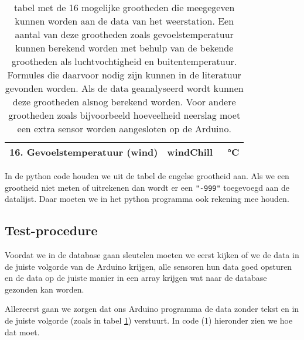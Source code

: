\begin{center}
\begin{table}
\begin{tabular}{ | l | l | l|}
    16. Gevoelstemperatuur (wind) & windChill & \SI{}{\celsius}    \\ \hline
   \end{tabular}
   \caption{tabel met de 16 mogelijke grootheden die meegegeven kunnen worden aan
   de data van het weerstation. Een aantal van deze grootheden zoals gevoelstemperatuur
   kunnen berekend worden met behulp van de bekende grootheden als luchtvochtigheid
   en buitentemperatuur. Formules die daarvoor nodig zijn kunnen in de literatuur gevonden worden.
   Als de data geanalyseerd wordt kunnen deze grootheden alsnog berekend worden.
   Voor andere grootheden zoals bijvoorbeeld hoeveelheid neerslag moet 
   een extra sensor worden aangesloten op de Arduino.}
   \label{table:grootheden}
\end{table}
\end{center}

In de python code houden we uit de tabel de engelse grootheid aan. Als we een grootheid
niet meten of uitrekenen dan wordt er een \verb|"-999"| toegevoegd aan de datalijst.
Daar moeten we in het python programma ook rekening mee houden.

\subsection{Test-procedure} 
Voordat we in de database gaan sleutelen moeten we eerst kijken of we de
data in de juiste volgorde van de Arduino krijgen, alle sensoren hun data goed opsturen
en de data op de juiste manier in een array krijgen wat naar de \hisparc database 
gezonden kan worden.

Allereerst gaan we zorgen dat ons Arduino programma de data zonder tekst en 
in de juiste volgorde (zoals in tabel \ref{table:grootheden}) verstuurt. 
In code (1) hieronder zien we hoe dat moet.


